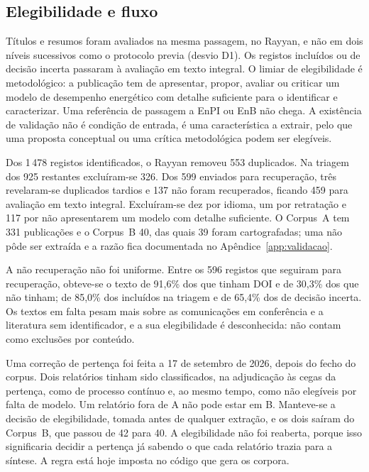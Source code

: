 \subsection{Elegibilidade e fluxo}

Títulos e resumos foram avaliados na mesma passagem, no Rayyan, e não em
dois níveis sucessivos como o protocolo previa (desvio D1). Os registos
incluídos ou de decisão incerta passaram à avaliação em texto integral.
O limiar de elegibilidade é metodológico: a publicação tem de apresentar,
propor, avaliar ou criticar um modelo de desempenho energético com detalhe
suficiente para o identificar e caracterizar. Uma referência de passagem a
EnPI ou EnB não chega. A existência de validação não é condição de entrada,
é uma característica a extrair, pelo que uma proposta conceptual ou uma
crítica metodológica podem ser elegíveis.

Dos 1\,478 registos identificados, o Rayyan removeu 553 duplicados. Na
triagem dos 925 restantes excluíram-se 326. Dos 599 enviados para
recuperação, três revelaram-se duplicados tardios e 137 não foram
recuperados, ficando 459 para avaliação em texto integral. Excluíram-se
dez por idioma, um por retratação e 117 por não apresentarem um modelo com
detalhe suficiente. O Corpus~A tem 331 publicações e o Corpus~B 40, das
quais 39 foram cartografadas; uma não pôde ser extraída e a razão fica
documentada no Apêndice~\ref{app:validacao}.

A não recuperação não foi uniforme. Entre os 596 registos que seguiram
para recuperação, obteve-se o texto de 91,6\% dos que tinham DOI e de
30,3\% dos que não tinham; de 85,0\% dos incluídos na triagem e de 65,4\%
dos de decisão incerta. Os textos em falta pesam mais sobre as
comunicações em conferência e a literatura sem identificador, e a sua
elegibilidade é desconhecida: não contam como exclusões por conteúdo.

Uma correção de pertença foi feita a 17 de setembro de 2026, depois do
fecho do corpus. Dois relatórios tinham sido classificados, na adjudicação
às cegas da pertença, como de processo contínuo e, ao mesmo tempo, como não
elegíveis por falta de modelo. Um relatório fora de A não pode estar em B.
Manteve-se a decisão de elegibilidade, tomada antes de qualquer extração, e
os dois saíram do Corpus~B, que passou de 42 para 40. A elegibilidade não
foi reaberta, porque isso significaria decidir a pertença já sabendo o que
cada relatório trazia para a síntese. A regra está hoje imposta no código
que gera os corpora.

